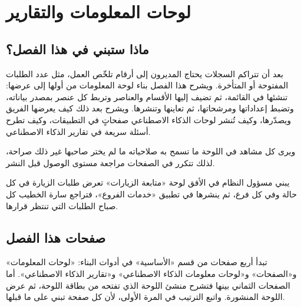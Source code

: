 \chapter{لوحات المعلومات والتقارير}
\label{ch:builder-dashboards}

\section{ماذا ستبني في هذا الفصل؟}
\label{sec:builder-dashboards-intro}

بعد أن تتراكم السجلات يحتاج المديرون إلى أرقام تلخّص العمل، مثل عدد الطلبات المفتوحة أو المتأخرة. ويشرح هذا الفصل بناء لوحة المعلومات من أولها إلى عرضها: تنشئها في القائمة، ثم تضيف إليها الأقسام والعناصر وتربط كل عنصر بمصدر بياناته، وتضبط إعداداتها ومرشحاتها، ثم تعاينها وتنشرها. ويشرح بعد ذلك كيف يعرضها الفريق ويصدّرها، وكيف تُنشر لوحات الذكاء الاصطناعي صفحاتٍ في التطبيقات، وكيف تطرح أسئلة سريعة في تقارير الذكاء الاصطناعي.

ويرى كل مشاهد في اللوحة ما تسمح به صلاحياته ما لم يختر صاحبها غير ذلك صراحة، لذلك تتكرر في الصفحات مراجعة مستوى الوصول قبل النشر.

\begin{rcnote}
يبني مسؤول النظام في الأفق لوحة «متابعة الزيارات» تعرض طلبات الزيارة في كل حالة وفي كل فرع، ثم ينشرها في تطبيق «خدمات الفروع»، فتراجع سارة الخطيب كل صباح الطلبات التي تنتظر قرارها.
\end{rcnote}

\section{صفحات هذا الفصل}
\label{sec:builder-dashboards-pages}

تبدأ أربع صفحات من قسم «الأساسية» في أدوات البناء: «لوحات المعلومات» و«الصفحات» و«لوحات معلومات الذكاء الاصطناعي» و«تقارير الذكاء الاصطناعي». أما الصفحات الثماني بينها فتشرح منشئ اللوحة الذي تفتحه من بطاقة اللوحة، ثم عرض اللوحة المنشورة. واتبع الترتيب في المرة الأولى، لأن كل صفحة تبني على ما قبلها.

